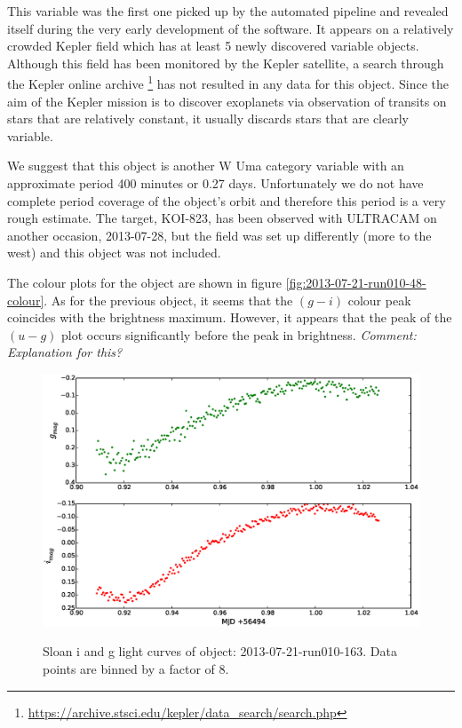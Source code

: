 This variable was the first one picked up by the automated pipeline and revealed itself during the very early development of the software. It appears on a relatively crowded Kepler field which has at least 5 newly discovered variable objects. Although this field has been monitored by the Kepler satellite, a search through the Kepler online archive \footnote{\url{https://archive.stsci.edu/kepler/data_search/search.php}} has not resulted in any data for this object. Since the aim of the Kepler mission is to discover exoplanets via observation of transits on stars that are relatively constant, it usually discards stars that are clearly variable. 

We suggest that this object is another {W Uma} category variable with an approximate period 400 minutes or 0.27 days. Unfortunately we do not have complete period coverage of the object's orbit and therefore this period is a very rough estimate. The target, KOI-823, has been observed with ULTRACAM on another occasion, 2013-07-28, but the field was set up differently (more to the west) and this object was not included. 

The colour plots for the object are shown in figure \ref{fig:2013-07-21-run010-48-colour}. As for the previous object, it seems that the $(g-i)$ colour peak coincides with the brightness maximum. However, it appears that the peak of the $(u-g)$ plot occurs significantly before the peak in brightness. \emph{Comment: Explanation for this?}


\newpage

\begin{figure}
  \center
  \includegraphics[width=120mm]{images/2013-07-21-run010-163_lightcurve-bin8.eps}
  \label{fig:2013-07-21-run010-163}
  \caption{Sloan i and g light curves of object: 2013-07-21-run010-163. Data points are binned by a factor of 8.}
\end{figure}

